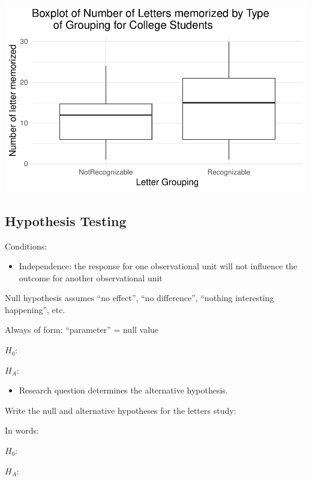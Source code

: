 \documentclass[
]{report}
\providecommand{\tightlist}{%
  \setlength{\itemsep}{0pt}\setlength{\parskip}{0pt}}
\newcommand{\rgi}{\hspace{24pt}}  %
\begin{document}
\begin{center}\includegraphics[width=0.6\linewidth]{12-LN012-1ofeach_files/figure-latex/unnamed-chunk-2-1} \end{center}

\hypertarget{hypothesis-testing-4}{%
\subsection*{Hypothesis Testing}\label{hypothesis-testing-4}}

Conditions:

\begin{itemize}
\tightlist
\item
  Independence: the response for one observational unit will not influence the outcome for another observational unit
\end{itemize}

Null hypothesis assumes ``no effect'', ``no difference'', ``nothing interesting happening'', etc.

\rgi Always of form: ``parameter'' = null value

\(H_0:\)

\vspace{0.5in}

\(H_A:\)

\vspace{0.5in}

\begin{itemize}
\tightlist
\item
  Research question determines the alternative hypothesis.
\end{itemize}

Write the null and alternative hypotheses for the letters study:

In words:

\(H_0:\)

\vspace{0.5in}

\(H_A:\)
\end{document}
